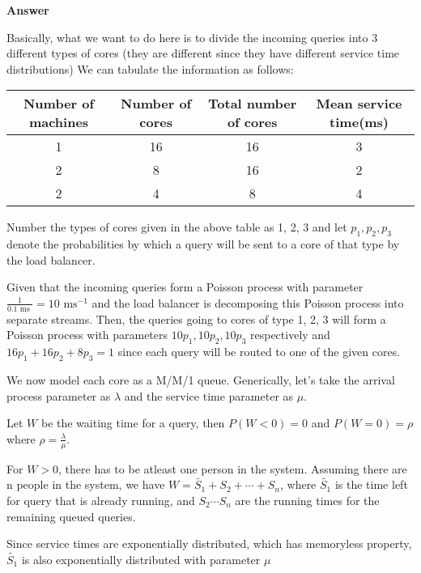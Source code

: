 \documentclass[12pt, oneside]{article}
\begin{document}
\begin{enumerate}
{    \textbf{Answer}

    Basically, what we want to do here is to divide the incoming queries into 3 different
    types of cores (they are different since they have different service time distributions)
    We can tabulate the information as follows:

    \begin{center}
        \begin{tabular}{| c | c | c | c |}
            \hline
            Number of machines & Number of cores & Total number of cores & Mean service time(ms) \\
            \hline
            1 & 16 & 16 & 3 \\
            2 & 8 & 16 & 2 \\
            2 & 4 & 8 & 4 \\
            \hline
        \end{tabular}
    \end{center}

    Number the types of cores given in the above table as 1, 2, 3 and let \(p_1, p_2, p_3\)
    denote the probabilities by which a query will be sent to a core of that type by the load
    balancer.

    Given that the incoming queries form a Poisson process with parameter 
    \(\frac{1}{0.1 \text{ ms }} = 10 \text{ ms}^{-1}\) and the load balancer is decomposing
    this Poisson process into separate streams. Then, the queries going to cores of type
    1, 2, 3 will form a Poisson process with parameters \(10p_1, 10p_2, 10p_3\) respectively
    and \(16p_1 + 16p_2 + 8p_3 = 1\) since each query will be routed to one of the given
    cores.

    We now model each core as a M/M/1 queue. Generically, let's take the arrival process
    parameter as \(\lambda\) and the service time parameter as \(\mu\).

    Let \(W\) be the waiting time for a query, then \(P(W < 0) = 0\) and \(P(W = 0) = \rho\)
    where \(\rho = \frac{\lambda}{\mu}\).

    For \(W > 0\), there has to be atleast one person in the system. Assuming there are n
    people in the system, we have \(W = \widetilde{S_1} + S_2 + \cdots + S_n\), where 
    \(\widetilde{S_1}\) is the time left for query that is already running, and \(S_2 \cdots S_n\)
    are the running times for the remaining queued queries.

    Since service times are exponentially distributed, which has memoryless property,
    \(\widetilde{S_1}\) is also exponentially distributed with parameter \(\mu\)

}
\end{enumerate}
\end{document}
